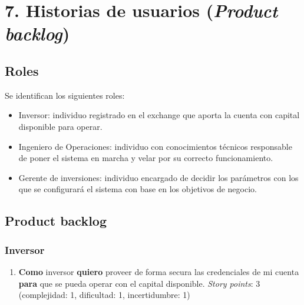 \documentclass[
    11pt, %
]{charter}
\begin{document}
    \section{7. Historias de usuarios (\textit{Product backlog})}
    \subsection{Roles}
    Se identifican los siguientes roles:
    \begin{itemize}
    \item Inversor: individuo registrado en el exchange que aporta la cuenta con capital disponible para operar.
    \item Ingeniero de Operaciones: individuo con conocimientos técnicos responsable de poner el sistema en marcha y velar por su correcto funcionamiento.
    \item Gerente de inversiones: individuo encargado de decidir los parámetros con los que se configurará el sistema con base en los objetivos de negocio.
    \end{itemize}

    \label{sec:backlog}
    \subsection{Product backlog}
    \subsubsection{Inversor}
    \begin{enumerate}
    \item \textbf{Como} inversor \textbf{quiero} proveer de forma secura las credenciales de mi cuenta \textbf{para} que se pueda operar con el capital disponible.
      \textit{Story points}: 3 (complejidad: 1, dificultad: 1, incertidumbre: 1)
    \end{enumerate}
\end{document}
